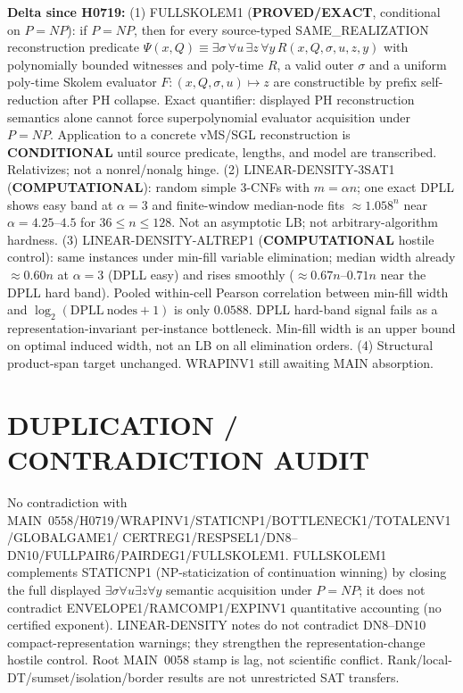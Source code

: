 \documentclass[11pt]{article}
\begin{document}
\textbf{Delta since H0719:}
(1) FULLSKOLEM1 (\textbf{PROVED/EXACT}, conditional on $P=NP$): if $P=NP$, then for every
source-typed SAME\_REALIZATION reconstruction predicate
$\Psi(x,Q)\equiv\exists\sigma\,\forall u\,\exists z\,\forall y\,R(x,Q,\sigma,u,z,y)$
with polynomially bounded witnesses and poly-time $R$, a valid outer $\sigma$ and a uniform
poly-time Skolem evaluator $F:(x,Q,\sigma,u)\mapsto z$ are constructible by prefix
self-reduction after PH collapse. Exact quantifier: displayed PH reconstruction semantics
alone cannot force superpolynomial evaluator acquisition under $P=NP$. Application to a
concrete vMS/SGL reconstruction is \textbf{CONDITIONAL} until source predicate, lengths, and
model are transcribed. Relativizes; not a nonrel/nonalg hinge.
(2) LINEAR-DENSITY-3SAT1 (\textbf{COMPUTATIONAL}): random simple 3-CNFs with $m=\alpha n$;
one exact DPLL shows easy band at $\alpha=3$ and finite-window median-node fits
$\approx 1.058^n$ near $\alpha=4.25$--$4.5$ for $36\le n\le128$. Not an asymptotic LB;
not arbitrary-algorithm hardness.
(3) LINEAR-DENSITY-ALTREP1 (\textbf{COMPUTATIONAL} hostile control): same instances under
min-fill variable elimination; median width already $\approx0.60n$ at $\alpha=3$ (DPLL easy)
and rises smoothly ($\approx0.67n$--$0.71n$ near the DPLL hard band). Pooled within-cell
Pearson correlation between min-fill width and $\log_2(\mathrm{DPLL\ nodes}+1)$ is only
$0.0588$. DPLL hard-band signal fails as a representation-invariant per-instance bottleneck.
Min-fill width is an upper bound on optimal induced width, not an LB on all elimination orders.
(4) Structural product-span target unchanged. WRAPINV1 still awaiting MAIN absorption.

\section*{DUPLICATION / CONTRADICTION AUDIT}
No contradiction with MAIN~0558/H0719/WRAPINV1/STATICNP1/BOTTLENECK1/TOTALENV1/GLOBALGAME1/
CERTREG1/RESPSEL1/DN8--DN10/FULLPAIR6/PAIRDEG1/FULLSKOLEM1.
FULLSKOLEM1 complements STATICNP1 (NP-staticization of continuation winning) by closing the
full displayed $\exists\sigma\forall u\exists z\forall y$ semantic acquisition under $P=NP$; it does
not contradict ENVELOPE1/RAMCOMP1/EXPINV1 quantitative accounting (no certified exponent).
LINEAR-DENSITY notes do not contradict DN8--DN10 compact-representation warnings; they
strengthen the representation-change hostile control. Root MAIN~0058 stamp is lag, not
scientific conflict. Rank/local-DT/sumset/isolation/border results are not unrestricted SAT
transfers.
\end{document}
